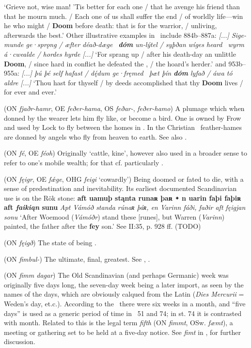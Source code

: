 \begin{itemize}
  ‘Grieve not, wise man! ’Tis better for each one / that he avenge his friend than that he mourn much. / Each one of us shall suffer the end / of worldly life—win he who might / \textbf{Doom} before death: that is for the warrior, / unliving, afterwards the best.’
  Other illustrative examples in \Beowulf\ include 884b–887a:
  \emph{[...] Sige-munde ge·sprǫng /
  æfter déað-dæge \hld\ \textbf{dóm} un-lýtel /
  syþðan wíges heard \hld\ wyrm á·cwealde /
  hordes hyrde [...]}
  ‘For  sprang up / after his death-day an unlittle  \textbf{Doom}, / since hard in conflict he defeated the , / the hoard’s herder.’
  and 953b–955a: \emph{[...] þú þé self hafast /
  dę́dum ge·fręmed \hld\ þæt þín \textbf{dóm} lyfað /
  áwa tó aldre [...]}
  ‘Thou hast for thyself / by deeds accomplished that thy \textbf{Doom} lives / for ever and ever.’

 (ON \emph{fjaðr-hamr}, OE \emph{feðer-hama}, OS \emph{feðar-}, \emph{feðer-hamo})
  A plumage which when donned by the wearer lets him fly like, or become a bird.  One is owned by Frow and used by Lock to fly between the homes in \Thrymskvida.  In the Christian \Heliand\ feather-hames are donned by angels who fly from heaven to earth.  See also .

 (ON \emph{fé}, OE \emph{féoh})
  Originally ‘cattle, kine’, however also used in a broader sense to refer to one’s mobile wealth; for that cf. particularly \Havamal.

 (ON \emph{fęigr}, OE \emph{fǽge}, OHG \emph{feigi} ‘cowardly’)
  Being doomed or fated to die, with a sense of predestination and inevitability.  Its earliest documented Scandinavian use is on the Rök stone: \textbf{aft uamuþ stąnta runaʀ þaʀ ᛭ n uarin faþi faþiʀ aft \emph{faikiąn} sunu} \emph{Apt Vámóð standa rúnaʀ þáʀ, en Varinn fáði, faðir aft \emph{fęigjan} sonu} ‘After Woemood (\emph{Vámóðr}) stand these [runes], but Warren (\emph{Varinn}) painted, the father after the \textbf{fey} son.’  See  II:35, p. 928 ff. (TODO)

 (ON \emph{fęigð})
  The state of being .

 (ON \emph{fimbul-})
  The ultimate, final, greatest.  See , .

 (ON \emph{fimm dagar})
  The Old Scandinavian (and perhaps Germanic) week was originally five days long, the seven-day week being a later import, as seen by the names of the days, which are obviously calqued from the Latin (\emph{Dies Mercurii} = Weden’s day, et.c.).  According to the \Gulatingslog\ there were six weeks in a month, and “five days” is used as a generic period of time in \Havamal\ 51 and 74; in st. 74 it is contrasted with month.  Related to this is the legal term \emph{fifth} (ON \emph{fimmt}, OSw. \emph{fæmt}), a meeting or gathering set to be held at a five-day notice.  See \emph{fimt} in \CV, \textcite{LMNL} for further discussion.


\end{itemize}

